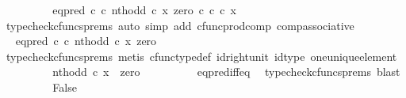 \begin{isabellebody}
\ \ \ \ \ \ \isamarkupfalse%
\ \isamarkupfalse%
\ {\isachardoublequoteopen}eq{\isacharunderscore}{\kern0pt}pred\ {\isasymnat}\isactrlsub c\ {\isasymcirc}\isactrlsub c\ {\isasymlangle}nth{\isacharunderscore}{\kern0pt}odd\ {\isasymcirc}\isactrlsub c\ x{\isacharcomma}{\kern0pt}\ zero\ {\isasymcirc}\isactrlsub c\ {\isasymbeta}\isactrlbsub {\isasymnat}\isactrlsub c\isactrlesub \ {\isasymcirc}\isactrlsub c\ x{\isasymrangle}\ {\isacharequal}{\kern0pt}\ {\isasymt}{\isachardoublequoteclose}\isanewline
\ \ \ \ \ \ \ \ \isamarkupfalse%
\ {\isacharparenleft}{\kern0pt}typecheck{\isacharunderscore}{\kern0pt}cfuncs{\isacharunderscore}{\kern0pt}prems{\isacharcomma}{\kern0pt}\ auto\ simp\ add{\isacharcolon}{\kern0pt}\ cfunc{\isacharunderscore}{\kern0pt}prod{\isacharunderscore}{\kern0pt}comp\ comp{\isacharunderscore}{\kern0pt}associative{}{\isacharparenright}{\kern0pt}\isanewline
\ \ \ \ \ \ \isamarkupfalse%
\ \isamarkupfalse%
\ {\isachardoublequoteopen}eq{\isacharunderscore}{\kern0pt}pred\ {\isasymnat}\isactrlsub c\ {\isasymcirc}\isactrlsub c\ {\isasymlangle}nth{\isacharunderscore}{\kern0pt}odd\ {\isasymcirc}\isactrlsub c\ x{\isacharcomma}{\kern0pt}\ zero{\isasymrangle}\ {\isacharequal}{\kern0pt}\ {\isasymt}{\isachardoublequoteclose}\isanewline
\ \ \ \ \ \ \ \ \isamarkupfalse%
\ {\isacharparenleft}{\kern0pt}typecheck{\isacharunderscore}{\kern0pt}cfuncs{\isacharunderscore}{\kern0pt}prems{\isacharcomma}{\kern0pt}\ metis\ cfunc{\isacharunderscore}{\kern0pt}type{\isacharunderscore}{\kern0pt}def\ id{\isacharunderscore}{\kern0pt}right{\isacharunderscore}{\kern0pt}unit\ id{\isacharunderscore}{\kern0pt}type\ one{\isacharunderscore}{\kern0pt}unique{\isacharunderscore}{\kern0pt}element{\isacharparenright}{\kern0pt}\isanewline
\ \ \ \ \ \ \isamarkupfalse%
\ \isamarkupfalse%
\ {\isachardoublequoteopen}nth{\isacharunderscore}{\kern0pt}odd\ {\isasymcirc}\isactrlsub c\ x\ {\isacharequal}{\kern0pt}\ zero{\isachardoublequoteclose}\isanewline
\ \ \ \ \ \ \ \ \isamarkupfalse%
\ eq{\isacharunderscore}{\kern0pt}pred{\isacharunderscore}{\kern0pt}iff{\isacharunderscore}{\kern0pt}eq\ \isamarkupfalse%
\ {\isacharparenleft}{\kern0pt}typecheck{\isacharunderscore}{\kern0pt}cfuncs{\isacharunderscore}{\kern0pt}prems{\isacharcomma}{\kern0pt}\ blast{\isacharparenright}{\kern0pt}\isanewline
\ \ \ \ \ \ \isamarkupfalse%
\ \isamarkupfalse%
\ False\isanewline
\ \ \ \ \ \ \ \ \isamarkupfalse%

\end{isabellebody}
